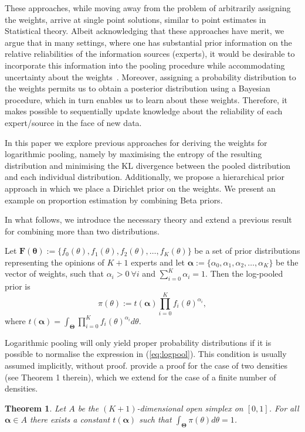 \documentclass[a4paper, notitlepage, 11pt]{article}
\newtheorem{theo}{Theorem}[]
\begin{document}
These approaches, while moving away from the problem of arbitrarily assigning the weights, arrive at single point solutions, similar to point estimates in Statistical theory.
Albeit acknowledging that these approaches have merit, we argue that in many settings, where one has substantial prior information on the relative reliabilities of the information sources (experts), it would be desirable to incorporate this information into the pooling procedure while accommodating uncertainty about the weights~\citep{poole2000}.
Moreover, assigning a probability distribution to the weights permits us to obtain a posterior distribution using a Bayesian procedure, which in turn enables us to learn about these weights.
Therefore, it makes possible to sequentially update knowledge about the reliability of each expert/source in the face of new data.

In this paper we explore previous approaches for deriving the weights for logarithmic pooling, namely by maximising the entropy of the resulting distribution and minimising the KL divergence between the pooled distribution and each individual distribution.
Additionally, we propose a hierarchical prior approach in which we place a Dirichlet prior on the weights.
We present an example on proportion estimation by combining Beta priors.

In what follows, we introduce the necessary theory and extend a previous 
result~\citep{poole2000} for combining more than two distributions.

Let $\mathbf{F(\theta)} := \{f_0(\theta), f_1(\theta), f_2(\theta), \ldots, f_K(\theta)\}$ be a set of prior distributions representing the opinions of $K+1$ experts and let $\boldsymbol\alpha :=\{\alpha_0, \alpha_1, \alpha_2, \ldots, \alpha_K \}$ be the vector of weights, such that $\alpha_i > 0\: \forall i$ and $\sum_{i=0}^K \alpha_i = 1$.
Then the log-pooled prior is
\begin{equation}
\label{eq:logpool}
 \pi(\theta) := t(\boldsymbol\alpha) \prod_{i=0}^K f_i(\theta)^{\alpha_i},
\end{equation}
where $t(\boldsymbol\alpha) = \int_{\boldsymbol\Theta}\prod_{i=0}^K f_i(\theta)^{\alpha_i}d\theta$.

Logarithmic pooling will only yield proper probability distributions if it is possible to normalise the expression in (\ref{eq:logpool}).
This condition is usually assumed implicitly, without proof.
\citet{poole2000} provide a proof for the case of two densities (see Theorem 1 therein), which we extend for the case of a finite number of densities.
\begin{theo}
\label{thm:normalisation}
Let $A$ be the $(K+1)$-dimensional open simplex on $[0,1]$.
For all $\boldsymbol\alpha \in A$ there exists a constant $t(\boldsymbol\alpha)$ such that $\int_{\boldsymbol\Theta}\pi(\theta)d\theta = 1$.
\end{theo}
\end{document}
